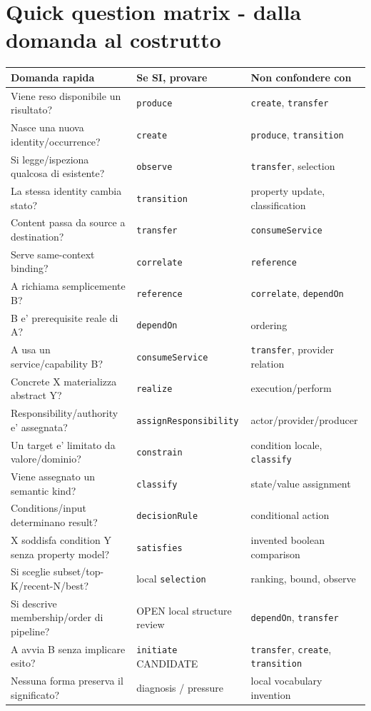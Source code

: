 \documentclass[11pt,a4paper]{article}
\begin{document}
\section{Quick question matrix - dalla domanda al costrutto}

\begin{longtable}{L{52mm}L{45mm}L{43mm}}
\toprule
\textbf{Domanda rapida} & \textbf{Se SI, provare} & \textbf{Non confondere con} \\
\midrule\endhead
Viene reso disponibile un risultato? & \texttt{produce} & \texttt{create}, \texttt{transfer} \\
Nasce una nuova identity/occurrence? & \texttt{create} & \texttt{produce}, \texttt{transition} \\
Si legge/ispeziona qualcosa di esistente? & \texttt{observe} & \texttt{transfer}, selection \\
La stessa identity cambia stato? & \texttt{transition} & property update, classification \\
Content passa da source a destination? & \texttt{transfer} & \texttt{consumeService} \\
Serve same-context binding? & \texttt{correlate} & \texttt{reference} \\
A richiama semplicemente B? & \texttt{reference} & \texttt{correlate}, \texttt{dependOn} \\
B e' prerequisite reale di A? & \texttt{dependOn} & ordering \\
A usa un service/capability B? & \texttt{consumeService} & \texttt{transfer}, provider relation \\
Concrete X materializza abstract Y? & \texttt{realize} & execution/perform \\
Responsibility/authority e' assegnata? & \texttt{assignResponsibility} & actor/provider/producer \\
Un target e' limitato da valore/dominio? & \texttt{constrain} & condition locale, \texttt{classify} \\
Viene assegnato un semantic kind? & \texttt{classify} & state/value assignment \\
Conditions/input determinano result? & \texttt{decisionRule} & conditional action \\
X soddisfa condition Y senza property model? & \texttt{satisfies} & invented boolean comparison \\
Si sceglie subset/top-K/recent-N/best? & local \texttt{selection} & ranking, bound, observe \\
Si descrive membership/order di pipeline? & OPEN local structure review & \texttt{dependOn}, \texttt{transfer} \\
A avvia B senza implicare esito? & \texttt{initiate} CANDIDATE & \texttt{transfer}, \texttt{create}, \texttt{transition} \\
Nessuna forma preserva il significato? & diagnosis / pressure & local vocabulary invention \\
\bottomrule
\end{longtable}
\end{document}
